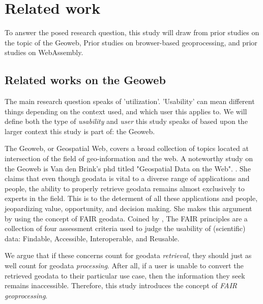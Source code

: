 
\newpage

\section{Related work}

To answer the posed research question, this study will draw from prior studies on the topic of the Geoweb, Prior studies on browser-based geoprocessing, and prior studies on WebAssembly.

\subsection{Related works on the Geoweb}
\label{sec:geoweb}

The main research question speaks of 'utilization'. 'Usability' can mean different things depending on the context used, and which user this applies to. We will define both the type of \emph{usability} and \emph{user} this study speaks of based upon the larger context this study is part of: the Geoweb.

The Geoweb, or Geospatial Web, covers a broad collection of topics located at intersection of the field of geo-information and the web. A noteworthy study on the Geoweb is Van den Brink's phd titled "Geospatial Data on the Web". \cite{brink_geospatial_2018}. She claims that even though geodata is vital to a diverse range of applications and people, the ability to properly retrieve geodata remains almost exclusively to experts in the field. This is to the determent of all these applications and people, jeopardizing value, opportunity, and decision making. She makes this argument by using the concept of FAIR geodata. Coined by \cite{mark_d_wilkinson_fair_2016}, The FAIR principles are a collection of four assessment criteria used to judge the usability of (scientific) data: Findable, Accessible, Interoperable, and Reusable. 

We argue that if these concerns count for geodata \textit{retrieval}, they should just as well count for geodata \textit{processing}. After all, if a user is unable to convert the retrieved geodata to their particular use case, then the information they seek remains inaccessible. Therefore, this study introduces the concept of \emph{FAIR geoprocessing}. 


